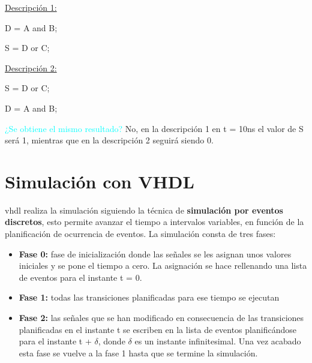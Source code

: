 \begin{multicols}{2}
	\underline{Descripción 1:}

	D = A and B;

	S = D or C;

	\columnbreak

	\underline{Descripción 2:}

	S = D or C;

	D = A and B;
\end{multicols}

\textcolor{cyan}{¿Se obtiene el mismo resultado?} No, en la descripción 1 en t = 10ns el valor de S será 1, mientras que en la descripción 2 seguirá siendo 0.



\section{Simulación con VHDL}
\gls{vhdl} realiza la simulación siguiendo la técnica de \textbf{simulación por eventos discretos}, esto permite avanzar el tiempo a intervalos variables, en función de la planificación de ocurrencia de eventos.
La simulación consta de tres fases:
\begin{itemize}
	\item\textbf{Fase 0: }fase de inicialización donde las señales se les asignan unos valores iniciales y se pone el tiempo a cero. La asignación se hace rellenando una lista de eventos para el instante t = 0.
	\item\textbf{Fase 1: }todas las transiciones planificadas para ese tiempo se ejecutan
	\item\textbf{Fase 2: }las señales que se han modificado en consecuencia de las transiciones planificadas en el instante t se escriben en la lista de eventos planificándose para el instante t + $\delta$, donde $\delta$ es un instante infinitesimal. Una vez acabado esta fase se vuelve a la fase 1 hasta que se termine la simulación.
\end{itemize}
\newpage

